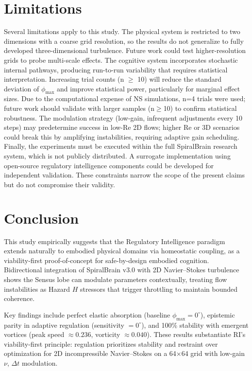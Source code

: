 \documentclass[12pt,a4paper]{article}
\begin{document}
\section{Limitations}

Several limitations apply to this study. The physical system is restricted to two dimensions with a coarse grid resolution, so the results do not generalize to fully developed three-dimensional turbulence. Future work could test higher-resolution grids to probe multi-scale effects. The cognitive system incorporates stochastic internal pathways, producing run-to-run variability that requires statistical interpretation. Increasing trial counts (n $\geq$ 10) will reduce the standard deviation of $\phi_{\max}$ and improve statistical power, particularly for marginal effect sizes. Due to the computational expense of NS simulations, n=4 trials were used; future work should validate with larger samples (n$\geq$10) to confirm statistical robustness. The modulation strategy (low-gain, infrequent adjustments every 10 steps) may predetermine success in low-Re 2D flows; higher Re or 3D scenarios could break this by amplifying instabilities, requiring adaptive gain scheduling. Finally, the experiments must be executed within the full SpiralBrain research system, which is not publicly distributed. A surrogate implementation using open-source regulatory intelligence components could be developed for independent validation. These constraints narrow the scope of the present claims but do not compromise their validity.

\section{Conclusion}

This study empirically suggests that the Regulatory Intelligence paradigm \cite{Cragin2026RI} extends naturally to embodied physical domains via homeostatic coupling, as a viability-first proof-of-concept for safe-by-design embodied cognition. Bidirectional integration of SpiralBrain v3.0 with 2D Navier--Stokes turbulence shows the Sensus lobe can modulate parameters contextually, treating flow instabilities as Hazard $H$ stressors that trigger throttling to maintain bounded coherence.

Key findings include perfect elastic absorption (baseline $\phi_{\max} = 0^\circ$), epistemic parity in adaptive regulation (sensitivity $= 0^\circ$), and 100\% stability with emergent vortices (peak speed $\approx 0.236$, vorticity $\approx 0.040$). These results substantiate RI's viability-first principle: regulation prioritizes stability and restraint over optimization for 2D incompressible Navier--Stokes on a 64×64 grid with low-gain $\nu$, $\Delta t$ modulation.
\end{document}
